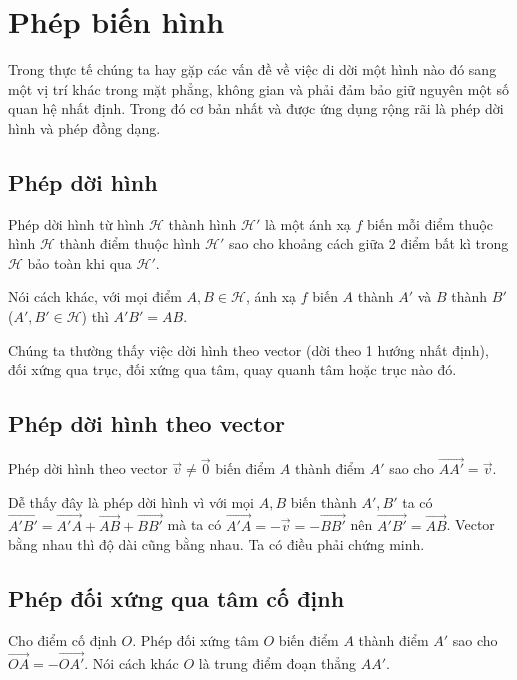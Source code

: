 \chapter{Phép biến hình}

Trong thực tế chúng ta hay gặp các vấn đề về việc di dời một hình
nào đó sang một vị trí khác trong mặt phẳng, không gian và phải đảm bảo 
giữ nguyên một số quan hệ nhất định. Trong đó cơ bản nhất và được ứng dụng 
rộng rãi là phép dời hình và phép đồng dạng.

\section{Phép dời hình}

\begin{definition}
    Phép dời hình từ hình $\mathcal{H}$ thành hình $\mathcal{H}'$ 
    là một ánh xạ $f$ biến mỗi điểm thuộc hình $\mathcal{H}$ thành điểm
    thuộc hình $\mathcal{H}'$ sao cho khoảng cách giữa 2 điểm bất
    kì trong $\mathcal{H}$ bảo toàn khi qua $\mathcal{H}'$.
\end{definition}

Nói cách khác, với mọi điểm $A, B \in \mathcal{H}$, ánh xạ $f$
biến $A$ thành $A'$ và $B$ thành $B'$ ($A', B' \in \mathcal{H}$)
thì $A'B' = AB$.

Chúng ta thường thấy việc dời hình theo vector (dời theo 1 hướng nhất định),
đối xứng qua trục, đối xứng qua tâm, quay quanh tâm hoặc trục nào đó.

\section{Phép dời hình theo vector}

Phép dời hình theo vector $\vec{v} \neq \vec{0}$ biến
điểm $A$ thành điểm $A'$ sao cho $\overrightarrow{AA'} = \vec{v}$.

Dễ thấy đây là phép dời hình vì với mọi $A, B$ biến thành $A', B'$ ta có
$\overrightarrow{A'B'} = \overrightarrow{A'A} + \overrightarrow{AB} + \overrightarrow{BB'}$
mà ta có $\overrightarrow{A'A} = -\vec{v} = -\overrightarrow{BB'}$ nên
$\overrightarrow{A'B'} = \overrightarrow{AB}$. Vector bằng nhau thì độ dài cũng bằng nhau.
Ta có điều phải chứng minh.

\section{Phép đối xứng qua tâm cố định}

Cho điểm cố định $O$. Phép đối xứng tâm $O$ biến điểm $A$ thành điểm $A'$ sao
cho $\overrightarrow{OA} = -\overrightarrow{OA'}$. Nói cách khác $O$ là trung điểm
đoạn thẳng $AA'$.

